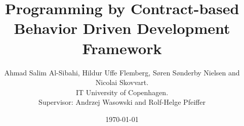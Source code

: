 \documentclass[a4paper]{report}
\begin{document}
\title{Programming by Contract-based Behavior Driven Development Framework}
\author{Ahmad Salim Al-Sibahi, Hildur Uffe Flemberg, Søren Sønderby Nielsen and Nicolai Skovvart.\\IT University of Copenhagen.\\Supervisor: Andrzej Wasowski and Rolf-Helge Pfeiffer}
\date{\today}

\maketitle



\tableofcontents





















\end{document}
